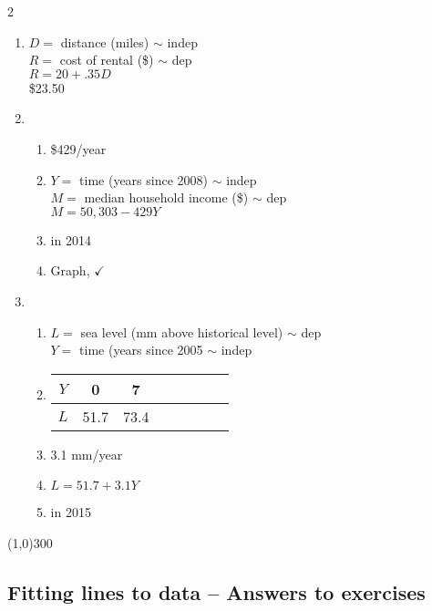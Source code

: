 \begin{multicols} {2}
\begin{enumerate}
\item %
 $D=$ distance (miles) $\sim$ indep \\ $R=$ cost of rental (\$) $\sim$ dep \\ $R=20 + .35D$ \\ \$23.50

\item %
\begin{enumerate}
\item \$429/year
\item $Y=$ time (years since 2008) $\sim$ indep \\ $M=$ median household income (\$) $\sim$ dep \\ $M = 50,303-429Y$
\item in 2014
\item Graph, $\checkmark$
\end{enumerate}

\item %
\begin{enumerate}
\item $L=$ sea level (mm above historical level) $\sim$ dep \\ $Y=$ time (years since 2005 $\sim$ indep 
\item \begin{tabular} {|c| |c|c |c|c |c|c |c|}\hline
$Y$ & 0 & 7\\ \hline
$L$ & 51.7 & 73.4  \\ \hline
\end{tabular}
\item 3.1 mm/year 
\item $L=51.7+3.1Y$
\item in 2015
\end{enumerate}

\end{enumerate}
\end{multicols}

\begin{center}
\line(1,0){300} %
\end{center}

\subsection {Fitting lines to data -- Answers to exercises} %

